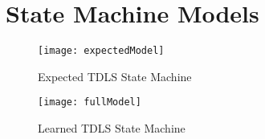 \chapter{State Machine Models}\label{appendix:a}

\begin{figure}[!h]
	\centering
	\texttt{[image: expectedModel]}
	\caption{Expected TDLS State Machine}
	\label{fig:tdls-sm-expected}
\end{figure}

\begin{figure}[!h]
	\centering
	\texttt{[image: fullModel]}
	\caption{Learned TDLS State Machine}
	\label{fig:tdls-sm-full}
\end{figure}

